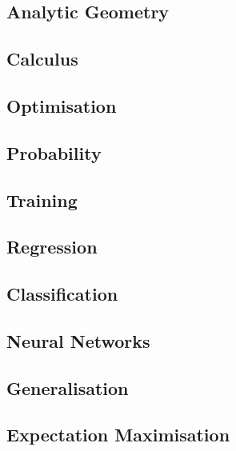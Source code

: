 \documentclass{article}
\begin{document}
  \begin{multicols}{2}
  \subsection*{Analytic Geometry}
  

  \subsection*{Calculus}
  

  \subsection*{Optimisation}
  

  \subsection*{Probability}
  

  \subsection*{Training}
  

  \subsection*{Regression}
  

  \subsection*{Classification}
  

  \subsection*{Neural Networks}
  
  

  \subsection{Generalisation}
  

  \subsection*{Expectation Maximisation}
  

  \end{multicols}
\end{document}
